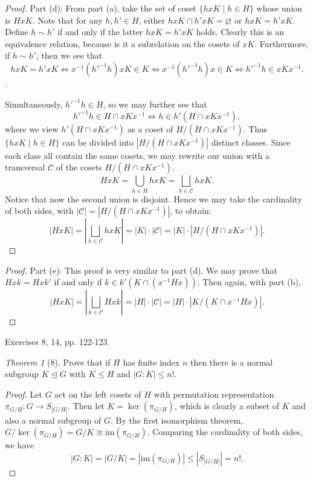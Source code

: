 \documentclass[12pt]{article}
\theoremstyle{remark}
\theoremstyle{named}
\newtheorem*{theorem}{Theorem}
\newcommand{\normal}{\trianglelefteq}
\begin{document}
\begin{proof}
    Part (d): From part (a), take the set of coset \(\{hxK \mid h \in H\}\) whose union is \(HxK\). Note that for any \(h, h' \in H\), either \(hxK \cap h'xK = \varnothing\) or \(hxK = h'xK\). Define \(h \sim h'\) if and only if the latter \(hxK = h'xK\) holds. 
    Clearly this is an equivalence relation, because is it a subrelation on the cosets of \(xK\). Furthermore, if \(h \sim h'\), then we see that \[hxK = h'xK \iff x^{-1}(h'^{-1}h)x K \in K \iff x^{-1}(h'^{-1}h)x \in K \iff h'^{-1}h \in xKx^{-1}.\].

    Simultaneously, \(h'^{-1}h \in H\), so we may further see that \[h'^{-1}h \in H \cap xKx^{-1} \iff h \in h'(H \cap xKx^{-1}),\]
    where we view \(h'(H \cap xKx^{-1})\) as a coset of \(H / (H \cap xKx^{-1})\). Thus \(\{hxK \mid h \in H\}\) can be divided into \(|H / (H \cap xKx^{-1})|\) distinct classes. Since each class all contain the same cosets, we may rewrite our union with a transversal \(\mathcal C\) of the cosets \(H / (H \cap xKx^{-1})\).
    \[HxK = \bigcup_{h \in H} hxK = \bigsqcup_{h \in \mathcal C} hxK.\]
    Notice that now the second union is disjoint. Hence we may take the cardinality of both sides, with \(|\mathcal C| = |H / (H \cap xKx^{-1})|\), to obtain:
    \[|HxK| = \left|\bigsqcup_{h \in \mathcal C} hxK\right| = |K| \cdot |\mathcal C| = |K| \cdot |H / (H \cap xKx^{-1})|.\]
\end{proof}

\begin{proof}
    Part (e): This proof is very similar to part (d). We may prove that \(Hxk = Hxk'\) if and only if \(k \in k'(K \cap (x^{-1} H x))\). Then again, with part (b),
    \[|HxK| = \left|\bigsqcup_{k \in \mathcal C} Hxk\right| = |H| \cdot |\mathcal C| = |H| \cdot |K / (K \cap x^{-1}Hx)|.\]
\end{proof}

Exercises 8, 14, pp. 122-123.

\begin{theorem}[8]
    Prove that if \(H\) has finite index \(n\) then there is a normal subgroup \(K \normal G\) with \(K \le H\) and \(|G : K| \le n!\). 
\end{theorem}

\begin{proof}
    Let \(G\) act on the left cosets of \(H\) with permutation representation \(\pi_{G / H} : G \to S_{|G/H|}\). Then let \(K = \ker (\pi_{G/H})\), which is clearly a subset of \(K\) and also a normal subgroup of \(G\). By the first isomorphism theorem, \(G / \ker(\pi_{G/H}) = G / K \cong \text{im}(\pi_{G/H})\). Comparing the cardinality of both sides, we have \
    \[|G : K| = |G / K| = |\text{im}(\pi_{G / H})| \le |S_{|G / H|}| = n!.\]
\end{proof}
\end{document}
